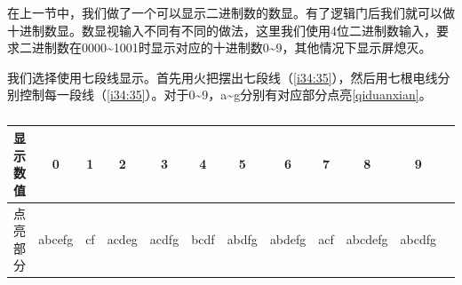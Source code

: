 在上一节中，我们做了一个可以显示二进制数的数显。有了逻辑门后我们就可以做十进制数显。数显视输入不同有不同的做法，这里我们使用4位二进制数输入，要求二进制数在0000\~{}1001时显示对应的十进制数0\~{}9，其他情况下显示屏熄灭。

我们选择使用七段线显示。首先用火把摆出七段线（\autoref{i34:35}），然后用七根电线分别控制每一段线（\autoref{i34:35}）。对于0\~{}9，a\~{}g分别有对应部分点亮\autoref{qiduanxian}。

\begin{figure}[!ht]
\begin{center}
\quad
{}
\end{center}
\caption{}
\label{i34:35}
\end{figure}

\begin{table}[!ht]
\centering
\begin{tabular}{c|c|c|c|c|c|c|c|c|c|c|c}
显示数值&0		&1	&2		&3		&4		&5		&6		&7		&8			&9\\
\hline
点亮部分&abcefg	&cf	&acdeg	&acdfg	&bcdf	&abdfg	&abdefg	&acf	&abcdefg	&abcdfg
\end{tabular}
\caption{}
\label{qiduanxian}
\end{table}

